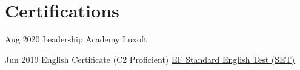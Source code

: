
\section{Certifications}

\dateitem
    {Aug 2020}
    {Leadership Academy}
    {Luxoft}

\dateitem
    {Jun 2019}
    {English Certificate (C2 Proficient)}
    {\href{https://www.efset.org/cert/BAUjza}{EF Standard English Test (SET)}}

